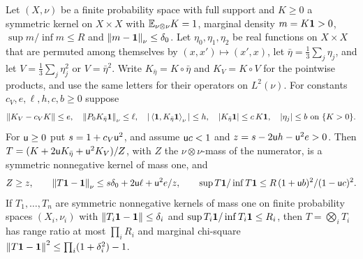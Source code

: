 \begin{lemma}\label{lem:tilt-marginals}
Let $(X,\nu)$ be a finite probability space with full support and $K\ge0$ a
symmetric kernel on $X\times X$ with $\mathbb E_{\nu\otimes\nu}K=1$, marginal density
$m=K\mathbf 1>0$, $\sup m/\inf m\le R$ and $\left\|m-\mathbf 1\right\|_\nu\le\delta_0$. Let
$\eta_0,\eta_1,\eta_2$ be real functions on $X\times X$ that are permuted among themselves by
$(x,x')\mapsto(x',x)$, let $\bar\eta=\frac13\sum_j\eta_j$, and let
$V=\frac13\sum_j\eta_j^2$ or $V=\bar\eta^2$. Write $K_{\bar\eta}=K\circ\bar\eta$ and
$K_V=K\circ V$ for the pointwise products, and use the same letters for their
operators on $L^2(\nu)$. For constants $c_V,e,\ell,h,c,b\ge0$ suppose
\[
  \left\|K_V-c_VK\right\|\le e,\quad\left\|P_0K_{\bar\eta}\mathbf 1\right\|_\nu\le\ell,\quad
  |\left\langle \mathbf 1,K_{\bar\eta}\mathbf 1\right\rangle_\nu|\le h,\quad|K_{\bar\eta}\mathbf 1|\le c\,K\mathbf 1,\quad
  |\eta_j|\le b\ \text{on}\ \{K>0\}.
\]
For $\mathsf u\ge0$ put $s=1+c_V\mathsf u^2$, and assume $\mathsf u c<1$ and
$z=s-2\mathsf u h-\mathsf u^2e>0$. Then $T=(K+2\mathsf u K_{\bar\eta}+\mathsf u^2K_V)/Z$, with
$Z$ the $\nu\otimes\nu$-mass of the numerator, is a symmetric nonnegative kernel
of mass one, and
\[
  Z\ge z,\qquad\left\|T\mathbf 1-\mathbf 1\right\|_\nu\le s\delta_0+2\mathsf u\ell+\mathsf u^2e/z,
  \qquad\sup T\mathbf 1/\inf T\mathbf 1\le R\,(1+\mathsf u b)^2/(1-\mathsf u c)^2.
\]
If $T_1,\dots,T_n$ are symmetric nonnegative kernels of mass one on finite
probability spaces $(X_i,\nu_i)$ with $\left\|T_i\mathbf 1-\mathbf 1\right\|\le\delta_i$ and
$\sup T_i\mathbf 1/\inf T_i\mathbf 1\le R_i$, then $T=\bigotimes_iT_i$ has range ratio at
most $\prod_iR_i$ and marginal chi-square
$\left\|T\mathbf 1-\mathbf 1\right\|^2\le\prod_i(1+\delta_i^2)-1$.
\end{lemma}

